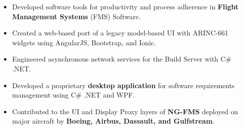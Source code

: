\begin{itemize}
    \item Developed software tools for productivity and process adherence in \textbf{Flight Management Systems} (FMS) Software.
    \item Created a web-based port of a legacy model-based UI with ARINC-661 widgets using AngularJS, Bootstrap, and Ionic.
    \item Engineered asynchronous network services for the Build Server with C\# .NET.
    \item Developed a proprietary \textbf{desktop application} for software requirements management using C\# .NET and WPF.
    \item Contributed to the UI and Display Proxy layers of \textbf{NG-FMS} deployed on major aircraft by \textbf{Boeing, Airbus, Dassault, and Gulfstream}.
\end{itemize}